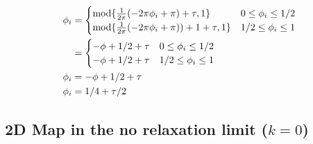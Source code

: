 \begin{align*}
\phi_i & = 
    \begin{cases}
    \textnormal{mod} \{\frac{1}{2\pi}(-2\pi\phi_i+\pi) + \tau,1\} & 0 \leq \phi_i \leq 1/2 \\
    \textnormal{mod} \{\frac{1}{2\pi}(-2\pi\phi_i+\pi)) + 1 +\tau ,1\} & 1/2 \leq \phi_i \leq 1 \\
    \end{cases}\\
    & = 
    \begin{cases}
    -\phi + 1/2 +\tau & 0 \leq \phi_i \leq 1/2 \\
    -\phi + 1/2 +\tau & 1/2 \leq \phi_i \leq 1 \\
    \end{cases}\\
    \phi_i & =  -\phi + 1/2 +\tau \\
    \phi_i & = 1/4 +\tau/2 \label{eq: k0 phi}
\end{align*}

\subsection{2D Map in the no relaxation limit ($k=0$)}

